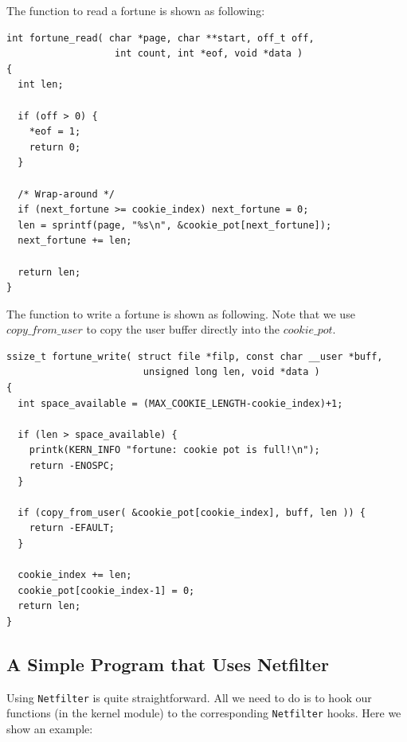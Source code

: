 The function to read a fortune is shown as following:

\begin{Verbatim}[frame=single]
int fortune_read( char *page, char **start, off_t off,
                   int count, int *eof, void *data )
{
  int len;

  if (off > 0) {
    *eof = 1;
    return 0;
  }

  /* Wrap-around */
  if (next_fortune >= cookie_index) next_fortune = 0;
  len = sprintf(page, "%s\n", &cookie_pot[next_fortune]);
  next_fortune += len;

  return len;
}
\end{Verbatim}

The function to write a fortune is shown as following. Note that
we use $copy\_from\_user$ to copy the user buffer directly into the $cookie\_pot$.

\begin{Verbatim}[frame=single]
ssize_t fortune_write( struct file *filp, const char __user *buff,
                        unsigned long len, void *data )
{
  int space_available = (MAX_COOKIE_LENGTH-cookie_index)+1;

  if (len > space_available) {
    printk(KERN_INFO "fortune: cookie pot is full!\n");
    return -ENOSPC;
  }

  if (copy_from_user( &cookie_pot[cookie_index], buff, len )) {
    return -EFAULT;
  }

  cookie_index += len;
  cookie_pot[cookie_index-1] = 0;
  return len;
}
\end{Verbatim}



\subsection{A Simple Program that Uses Netfilter}

Using {\tt Netfilter} is quite straightforward. All we need to do
is to hook our functions (in the kernel module) to the corresponding
{\tt Netfilter} hooks. Here we show an example:

